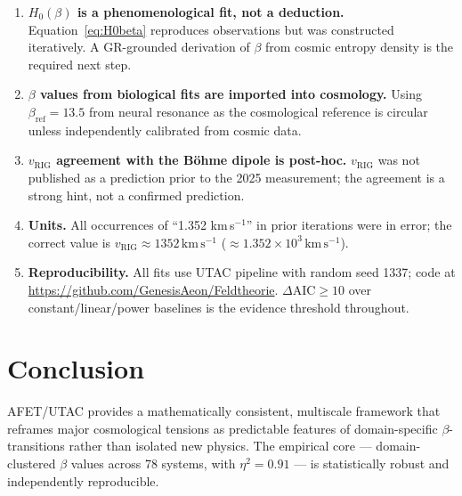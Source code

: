 \documentclass[12pt,a4paper]{article}
\theoremstyle{definition}
\newcommand{\betaref}{\beta_{\mathrm{ref}}}
\newcommand{\vrig}{v_{\mathrm{RIG}}}
\begin{document}
\begin{enumerate}[leftmargin=2em, label=\arabic*.]
  \item \textbf{$H_0(\beta)$ is a phenomenological fit, not a deduction.}
        Equation~\eqref{eq:H0beta} reproduces observations but was
        constructed iteratively. A GR-grounded derivation of $\beta$
        from cosmic entropy density is the required next step.

  \item \textbf{$\beta$ values from biological fits are imported into cosmology.}
        Using $\betaref = 13.5$ from neural resonance as the cosmological
        reference is circular unless independently calibrated from cosmic data.

  \item \textbf{$\vrig$ agreement with the Böhme dipole is post-hoc.}
        $\vrig$ was not published as a prediction prior to the 2025 measurement;
        the agreement is a strong hint, not a confirmed prediction.

  \item \textbf{Units.}
        All occurrences of ``1.352 km\,s$^{-1}$'' in prior iterations
        were in error; the correct value is
        $\vrig \approx 1352\,\mathrm{km\,s^{-1}}$ ($\approx 1.352 \times 10^3\,\mathrm{km\,s^{-1}}$).

  \item \textbf{Reproducibility.}
        All fits use UTAC pipeline with random seed 1337; code at\\
        \url{https://github.com/GenesisAeon/Feldtheorie}.
        $\Delta\mathrm{AIC} \geq 10$ over constant/linear/power baselines
        is the evidence threshold throughout.
\end{enumerate}

\section{Conclusion}

AFET/UTAC provides a mathematically consistent, multiscale framework that reframes
major cosmological tensions as predictable features of domain-specific $\beta$-transitions
rather than isolated new physics.
The empirical core --- domain-clustered $\beta$ values across 78 systems, with $\eta^2 = 0.91$ ---
is statistically robust and independently reproducible.
\end{document}
